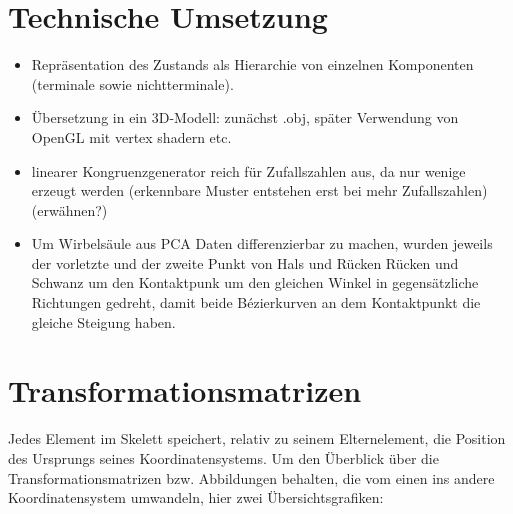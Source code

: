 \section{Technische Umsetzung}

\begin{itemize}
 \item Repräsentation des Zustands als Hierarchie von einzelnen Komponenten (terminale sowie nichtterminale).
 \item Übersetzung in ein 3D-Modell: zunächst .obj, später Verwendung von OpenGL mit vertex shadern etc.\
 \item linearer Kongruenzgenerator reich für Zufallszahlen aus, da nur wenige erzeugt werden (erkennbare Muster entstehen erst bei mehr Zufallszahlen) (erwähnen?)
 \item Um Wirbelsäule aus PCA Daten differenzierbar zu machen, wurden jeweils der vorletzte und der zweite Punkt von Hals und Rücken \bzw Rücken und Schwanz um den Kontaktpunk um den gleichen Winkel in gegensätzliche Richtungen gedreht, damit beide Bézierkurven an dem Kontaktpunkt die gleiche Steigung haben. 
\end{itemize}

\section{Transformationsmatrizen}


Jedes Element im Skelett speichert, relativ zu seinem Elternelement, die Position des Ursprungs seines Koordinatensystems. Um den Überblick über die Transformationsmatrizen bzw. Abbildungen behalten, die vom einen ins andere Koordinatensystem umwandeln, hier zwei Übersichtsgrafiken:

